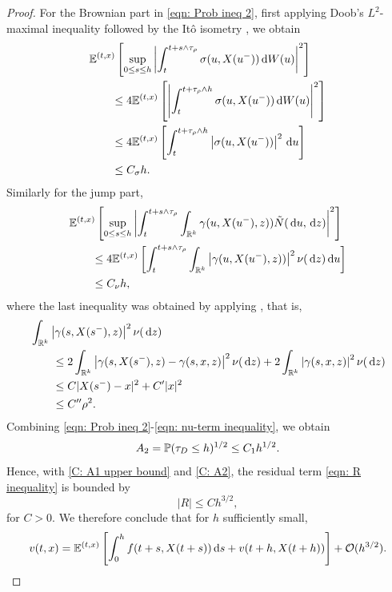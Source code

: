 \begin{proof}
    For the Brownian part in \eqref{eqn: Prob ineq 2}, first applying Doob's $L^2$-maximal inequality \cite[Theorem 3.8 (iv)]{Karatzas1991} followed by the Itô isometry \cite[Theorem 1.17]{oksendal2007applied}, we obtain 
    \begin{align}
        & \mathbb{E}^{(t,x)} \left[\sup_{0 \leq s \leq h} \left| \int_t^{t+s \wedge \tau_\rho } \sigma(u, X(u^-)) \,\mathrm{d} W(u) \right|^2 \right] \\
        & \qquad \leq 4 \mathbb{E}^{(t,x)} \left[\left| \int_t^{t+ \tau_\rho \wedge h} \sigma(u,X(u^-)) \,\mathrm{d} W(u) \right|^2 \right] \nonumber \\
        & \qquad \leq 4 \mathbb{E}^{(t,x)} \left[ \int_t^{t+\tau_{\rho} \wedge h} \left|\sigma(u,X(u^-))\right|^2 \,\mathrm{d} u \right] \nonumber \\
        & \qquad \leq C_\sigma h. 
        \label{eqn: sigma-term inequality}
    \end{align}
    Similarly for the jump part,
    \begin{align}
        & \mathbb{E}^{(t,x)} \left[\sup_{0 \leq s \leq h} \left| \int_t^{t+s \wedge \tau_\rho } \int_{\mathbb{R}^k} \gamma(u,X(u^-),z)) \tilde N(\,\mathrm{d} u, \,\mathrm{d} z) \right|^2 \right] \nonumber \\
        & \qquad \leq 4 \mathbb{E}^{(t,x)} \left[\int_t^{t+s \wedge \tau_\rho }  \int_{\mathbb{R}^k} \left|\gamma(u,X(u^-),z))\right|^2 \nu(\,\mathrm{d} z) \,\mathrm{d} u \right] \nonumber \\
        & \qquad \leq C_\nu h,
        \label{eqn: nu-term inequality}
    \end{align}
    where the last inequality was obtained by applying , that is, 
    \begin{align*}
        & \int_{\mathbb{R}^k} \left| \gamma(s,X(s^-),z) \right|^2 \nu(\,\mathrm{d} z) \\
        & \qquad \leq 2 \int_{\mathbb{R}^k} \left| \gamma(s,X(s^-),z) - \gamma(s,x,z) \right|^2 \nu(\,\mathrm{d} z) + 2 \int_{\mathbb{R}^k}\left|\gamma(s,x,z) \right|^2 \nu(\,\mathrm{d} z)  \\
        & \qquad \leq C |X(s^-)-x|^2 + C'|x|^2 \\
        & \qquad \leq C'' \rho^2.
    \end{align*}
    Combining \eqref{eqn: Prob ineq 2}-\eqref{eqn: nu-term inequality}, we obtain 
    \begin{equation}
        A_2 = \mathbb{P} (\tau_D \leq h)^{1/2} \leq C_1 h^{1/2}.
        \label{C: A2}
    \end{equation}
    Hence, with \eqref{C: A1 upper bound} and \eqref{C: A2}, the residual term \eqref{eqn: R inequality} is bounded by
    \begin{equation*}
        |R| \leq C h^{3/2},
    \end{equation*}
    for $C>0$. We therefore conclude that for $h$ sufficiently small,
    \begin{equation*}
        v(t,x) = \mathbb{E}^{(t,x)} \left[ \int_0^h f(t+s,X(t+s)) \,\mathrm{d} s + v(t+h,X(t+h)) \right] + \mathcal{O}(h^{3/2}).
        \qedhere
    \end{equation*} 
\end{proof}